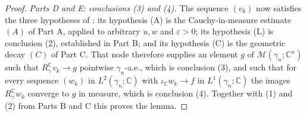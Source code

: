 \begin{proof}
\emph{Parts D and E: conclusions (3) and (4).}
The sequence $(v_k)$ now satisfies the three hypotheses of
: its hypothesis (A) is the
Cauchy-in-measure estimate $(A)$ of Part A, applied to arbitrary $u,w$ and
$\varepsilon > 0$; its hypothesis (L) is conclusion (2), established in Part B; and
its hypothesis (C) is the geometric decay $(C)$ of Part C.  That node therefore
supplies an element $g$ of $\mathcal{M}(\gamma_n;\mathbb{C}^n)$ such that
$R_\gamma^{\mathbb{C}} v_k \to g$ pointwise $\gamma_n$-a.e., which is conclusion
(3), and such that for every sequence $(w_k)$ in $L^2(\gamma_n;\mathbb{C})$ with
$\iota_{\mathbb{C}} w_k \to f$ in $L^1(\gamma_n;\mathbb{C})$ the images
$R_\gamma^{\mathbb{C}} w_k$ converge to $g$ in measure, which is conclusion (4).
Together with (1) and (2) from Parts B and C this proves the lemma.
\end{proof}
